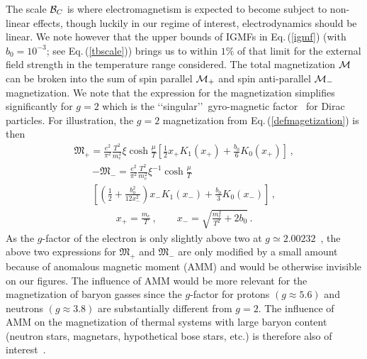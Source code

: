 \documentclass[reprint]{revtex4-2}
\newcommand{\req}[1]{Eq.\,(\ref{#1})}
\begin{document}
The scale ${\cal B}_{C}$ is where electromagnetism is expected to become subject to non-linear effects, though luckily in our regime of interest, electrodynamics should be linear. We note however that the upper bounds of IGMFs in \req{igmf} (with $b_{0}=10^{-3}$; see \req{tbscale}) brings us to within $1\%$ of that limit for the external field strength in the temperature range considered. The total magnetization ${\cal M}$ can be broken into the sum of spin parallel ${\cal M}_{+}$ and spin anti-parallel ${\cal M}_{-}$ magnetization. We note that the expression for the magnetization simplifies significantly for $g=2$ which is the \lq\lq singular\rq\rq\ gyro-magnetic factor~\cite{evans2022emergence,rafelski2022study} for Dirac particles. For illustration, the $g=2$ magnetization from \req{defmagetization} is then
\begin{align}
    \label{g2magplus}
    {\mathfrak M}_{+}=\frac{e^{2}}{\pi^{2}}\frac{T^{2}}{m_{e}^{2}}\xi\cosh{\frac{\mu}{T}}\left[\frac{1}{2}x_{+}K_{1}(x_{+})+\frac{b_{0}}{6}K_{0}(x_{+})\right]\,,
\end{align}
\begin{multline}        
    \label{g2magminus}
    -{\mathfrak M}_{-}=\frac{e^{2}}{\pi^{2}}\frac{T^{2}}{m_{e}^{2}}\xi^{-1}\cosh{\frac{\mu}{T}}\\
    \left[\left(\frac{1}{2}+\frac{b_{0}^{2}}{12x_{-}^{2}}\right)x_{-}K_{1}(x_{-})+\frac{b_{0}}{3}K_{0}(x_{-})\right]\,,
\end{multline}
\begin{align}
    x_{+}=\frac{m_{e}}{T}\,,\qquad
    x_{-}=\sqrt{\frac{m_{e}^{2}}{T^{2}}+2b_{0}}\,.
\end{align}
As the $g$-factor of the electron is only slightly above two at $g\simeq2.00232$~\cite{tiesinga2021codata}, the above two expressions for ${\mathfrak M}_{+}$ and ${\mathfrak M}_{-}$ are only modified by a small amount because of anomalous magnetic moment (AMM) and would be otherwise invisible on our figures. The influence of AMM would be more relevant for the magnetization of baryon gasses since the $g$-factor for protons $(g\approx5.6)$ and neutrons $(g\approx3.8)$ are substantially different from $g=2$. The influence of AMM on the magnetization of thermal systems with large baryon content (neutron stars, magnetars, hypothetical bose stars, etc.) is therefore also of interest~\cite{ferrer2019thermodynamics,ferrer2023importance}.
\end{document}
